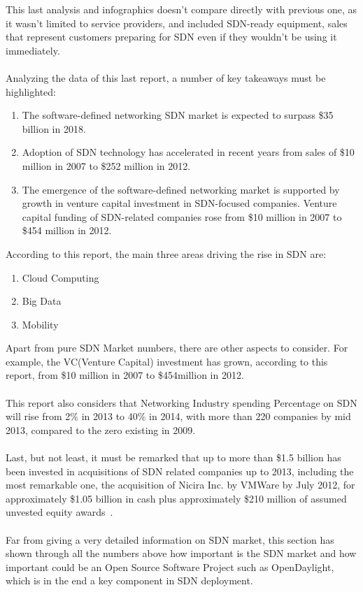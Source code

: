 \documentclass[a4paper, 12pt]{book}
\begin{document}
This last analysis and infographics doesn’t compare directly with previous one, as it wasn’t limited to service providers, and included SDN-ready equipment, sales that represent customers preparing for SDN even if they wouldn’t be using it immediately.\\
\\
Analyzing the data of this last report, a number of key takeaways must be highlighted:
\begin{enumerate}\itemsep0pt
 \item{The software-defined networking SDN market is expected to surpass \$35 billion in 2018}.
 \item{Adoption of SDN technology has accelerated in recent years from sales of \$10 million in 2007 to \$252 million in 2012}.
 \item{The emergence of the software-defined networking market is supported by growth in venture capital investment in SDN-focused companies}. Venture capital funding of SDN-related companies rose from \$10 million in 2007 to \$454 million in 2012.
\end{enumerate}

According to this report, the main three areas driving the rise in SDN are:
\begin{enumerate}\itemsep0pt
\item{Cloud Computing}
\item{Big Data}
\item{Mobility}
\end{enumerate}
Apart from pure SDN Market numbers, there are other aspects to consider. For example, the VC(Venture Capital) investment has grown, according to this report, from \$10 million in 2007 to \$454million in 2012.\\
\\
This report also considers that Networking Industry spending Percentage on SDN will rise from 2\% in 2013 to 40\% in 2014, with more than 220 companies by mid 2013, compared to the zero existing in 2009.\\
\\
Last, but not least, it must be remarked that up to more than \$1.5 billion has been invested in acquisitions of SDN related companies up to 2013, including the most remarkable one, the acquisition of Nicira Inc. by VMWare by July 2012, for approximately \$1.05 billion in cash plus approximately \$210 million of assumed unvested equity awards~\cite{VMWareAcquireNicira}.\\
\\
Far from giving a very detailed information on SDN market, this section has shown through all the numbers above how important is the SDN market and how important could be an Open Source Software Project such as OpenDaylight, which is in the end a key component in SDN deployment.
\end{document}
